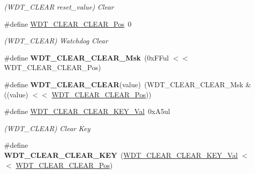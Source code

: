 \begin{DoxyCompactItemize}
\begin{DoxyCompactList}\small\item\em (W\+D\+T\+\_\+\+C\+L\+E\+A\+R reset\+\_\+value) Clear \end{DoxyCompactList}\item 
\hypertarget{group___s_a_m_l21___w_d_t_ga3059b0505f94ff8b2ff25fb53dd56999}{}\#define \hyperlink{group___s_a_m_l21___w_d_t_ga3059b0505f94ff8b2ff25fb53dd56999}{W\+D\+T\+\_\+\+C\+L\+E\+A\+R\+\_\+\+C\+L\+E\+A\+R\+\_\+\+Pos}~0\label{group___s_a_m_l21___w_d_t_ga3059b0505f94ff8b2ff25fb53dd56999}

\begin{DoxyCompactList}\small\item\em (W\+D\+T\+\_\+\+C\+L\+E\+A\+R) Watchdog Clear \end{DoxyCompactList}\item 
\hypertarget{group___s_a_m_l21___w_d_t_gac9c6223ece162be430a8f86942210ba9}{}\#define {\bfseries W\+D\+T\+\_\+\+C\+L\+E\+A\+R\+\_\+\+C\+L\+E\+A\+R\+\_\+\+Msk}~(0x\+F\+Ful $<$$<$ W\+D\+T\+\_\+\+C\+L\+E\+A\+R\+\_\+\+C\+L\+E\+A\+R\+\_\+\+Pos)\label{group___s_a_m_l21___w_d_t_gac9c6223ece162be430a8f86942210ba9}

\item 
\hypertarget{group___s_a_m_l21___w_d_t_ga5dceacac040596ca3a0941aad227e014}{}\#define {\bfseries W\+D\+T\+\_\+\+C\+L\+E\+A\+R\+\_\+\+C\+L\+E\+A\+R}(value)~(W\+D\+T\+\_\+\+C\+L\+E\+A\+R\+\_\+\+C\+L\+E\+A\+R\+\_\+\+Msk \& ((value) $<$$<$ \hyperlink{group___s_a_m_l21___w_d_t_ga3059b0505f94ff8b2ff25fb53dd56999}{W\+D\+T\+\_\+\+C\+L\+E\+A\+R\+\_\+\+C\+L\+E\+A\+R\+\_\+\+Pos}))\label{group___s_a_m_l21___w_d_t_ga5dceacac040596ca3a0941aad227e014}

\item 
\hypertarget{group___s_a_m_l21___w_d_t_gab9d83e2ecab22a9b789e5db90483a784}{}\#define \hyperlink{group___s_a_m_l21___w_d_t_gab9d83e2ecab22a9b789e5db90483a784}{W\+D\+T\+\_\+\+C\+L\+E\+A\+R\+\_\+\+C\+L\+E\+A\+R\+\_\+\+K\+E\+Y\+\_\+\+Val}~0x\+A5ul\label{group___s_a_m_l21___w_d_t_gab9d83e2ecab22a9b789e5db90483a784}

\begin{DoxyCompactList}\small\item\em (W\+D\+T\+\_\+\+C\+L\+E\+A\+R) Clear Key \end{DoxyCompactList}\item 
\hypertarget{group___s_a_m_l21___w_d_t_gad9b9dfd240e353ca00f7417e8cbbb637}{}\#define {\bfseries W\+D\+T\+\_\+\+C\+L\+E\+A\+R\+\_\+\+C\+L\+E\+A\+R\+\_\+\+K\+E\+Y}~(\hyperlink{group___s_a_m_l21___w_d_t_gab9d83e2ecab22a9b789e5db90483a784}{W\+D\+T\+\_\+\+C\+L\+E\+A\+R\+\_\+\+C\+L\+E\+A\+R\+\_\+\+K\+E\+Y\+\_\+\+Val}       $<$$<$ \hyperlink{group___s_a_m_l21___w_d_t_ga3059b0505f94ff8b2ff25fb53dd56999}{W\+D\+T\+\_\+\+C\+L\+E\+A\+R\+\_\+\+C\+L\+E\+A\+R\+\_\+\+Pos})\label{group___s_a_m_l21___w_d_t_gad9b9dfd240e353ca00f7417e8cbbb637}


\end{DoxyCompactItemize}
